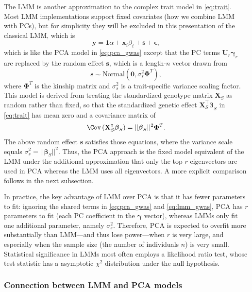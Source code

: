 \documentclass[11pt]{article}
\begin{document}
The LMM is another approximation to the complex trait model in \cref{eq:trait}.
Most LMM implementations support fixed covariates (how we combine LMM with PCs), but for simplicity they will be excluded in this presentation of the classical LMM, which is
\begin{equation}
  \label{eq:lmm_gwas}
  \mathbf{y}
  =
  \mathbf{1} \alpha + \mathbf{x}_i \beta_i + \mathbf{s} + \boldsymbol{\epsilon}
  ,
\end{equation}
which is like the PCA model in \cref{eq:pca_gwas} except that the PC terms $\mathbf{U}_r \boldsymbol{\gamma}_r$ are replaced by the random effect $\mathbf{s}$, which is a length-$n$ vector drawn from \citep{sul_population_2018}
$$
\mathbf{s} \sim \text{Normal} \left( \mathbf{0}, \sigma^2_s \mathbf{\Phi}^T \right),
$$
where $\mathbf{\Phi}^T$ is the kinship matrix and $\sigma^2_s$ is a trait-specific variance scaling factor.
This model is derived from treating the standardized genotype matrix $\mathbf{X}_S$ as random rather than fixed, so that the standardized genetic effect
$\mathbf{X}_S^\intercal \boldsymbol{\beta}_S$
in \cref{eq:trait} has mean zero and a covariance matrix of
$$
\Cov \left( \mathbf{X}_S^\intercal \boldsymbol{\beta}_S \right)
=
|| \boldsymbol{\beta}_S ||^2 \mathbf{\Phi}^T
.
$$
The above random effect $\mathbf{s}$ satisfies those equations, where the variance scale equals $\sigma^2_s = || \boldsymbol{\beta}_S ||^2$.
Thus, the PCA approach is the fixed model equivalent of the LMM under the additional approximation that only the top $r$ eigenvectors are used in PCA whereas the LMM uses all eigenvectors.
A more explicit comparison follows in the next subsection.

In practice, the key advantage of LMM over PCA is that it has fewer parameters to fit: ignoring the shared terms in \cref{eq:pca_gwas} and \cref{eq:lmm_gwas}, PCA has $r$ parameters to fit (each PC coefficient in the $\boldsymbol{\gamma}$ vector), whereas LMMs only fit one additional parameter, namely $\sigma^2_s$.
Therefore, PCA is expected to overfit more substantially than LMM---and thus lose power---when $r$ is very large, and especially when the sample size (the number of individuals $n$) is very small.
Statistical significance in LMMs most often employs a likelihood ratio test, whose test statistic has a asymptotic $\chi^2$ distribution under the null hypothesis.

\subsubsection{Connection between LMM and PCA models}
\end{document}
